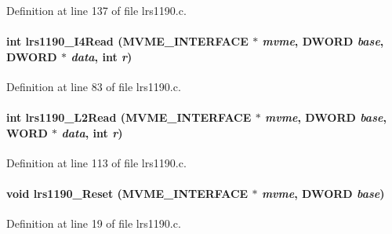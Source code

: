 Definition at line 137 of file lrs1190.c.
\paragraph[{lrs1190\_\-I4Read}]{\setlength{\rightskip}{0pt plus 5cm}int lrs1190\_\-I4Read ({\bf MVME\_\-INTERFACE} $\ast$ {\em mvme}, \/  {\bf DWORD} {\em base}, \/  {\bf DWORD} $\ast$ {\em data}, \/  int {\em r})}\hfill\label{lrs1190_8c_a174e25821613238c53f20c1866fd6bad}


Definition at line 83 of file lrs1190.c.
\paragraph[{lrs1190\_\-L2Read}]{\setlength{\rightskip}{0pt plus 5cm}int lrs1190\_\-L2Read ({\bf MVME\_\-INTERFACE} $\ast$ {\em mvme}, \/  {\bf DWORD} {\em base}, \/  {\bf WORD} $\ast$ {\em data}, \/  int {\em r})}\hfill\label{lrs1190_8c_ae584d1e934d4222cff28385e0060375f}


Definition at line 113 of file lrs1190.c.
\paragraph[{lrs1190\_\-Reset}]{\setlength{\rightskip}{0pt plus 5cm}void lrs1190\_\-Reset ({\bf MVME\_\-INTERFACE} $\ast$ {\em mvme}, \/  {\bf DWORD} {\em base})}\hfill\label{lrs1190_8c_aefc59eb1c2a33917cdc02e2538e72d72}


Definition at line 19 of file lrs1190.c.